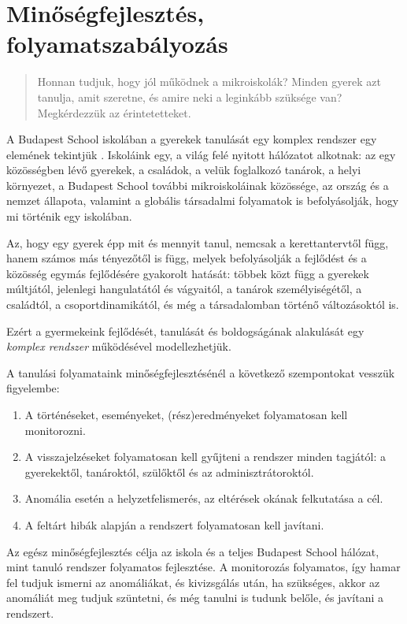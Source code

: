 \section{Minőségfejlesztés, folyamatszabályozás}
\label{sec:minosegbiztositas}
\begin{quote}
  Honnan tudjuk, hogy jól működnek a mikroiskolák? Minden gyerek azt tanulja,
  amit szeretne, és amire neki a leginkább szüksége van? Megkérdezzük az
  érintetetteket.
\end{quote}

A Budapest School iskolában a gyerekek tanulását egy komplex rendszer egy
elemének tekintjük \citep{barabasi}. Iskoláink egy, a világ felé nyitott
hálózatot alkotnak: az egy közösségben lévő gyerekek, a családok, a velük
foglalkozó tanárok, a helyi környezet, a Budapest School további
mikroiskoláinak közössége, az ország és a nemzet állapota, valamint a globális
társadalmi folyamatok is befolyásolják, hogy mi történik egy iskolában.

Az, hogy egy gyerek épp mit és mennyit tanul, nemcsak a kerettantervtől függ,
hanem számos más tényezőtől is függ, melyek befolyásolják a fejlődést és a
közösség egymás fejlődésére gyakorolt hatását: többek közt függ a gyerekek
múltjától, jelenlegi hangulatától és vágyaitól, a tanárok személyiségétől, a
családtól, a csoportdinamikától, és még a társadalomban történő változásoktól
is.

Ezért a gyermekeink fejlődését, tanulását és boldogságának alakulását egy
\emph{komplex rendszer} működésével modellezhetjük.

A tanulási folyamataink minőségfejlesztésénél a következő szempontokat vesszük
figyelembe:
\begin{enumerate}
  \item  A történéseket, eseményeket, (rész)eredményeket folyamatosan kell
        monitorozni.
  \item  A visszajelzéseket folyamatosan kell gyűjteni a rendszer minden
        tagjától: a gyerekektől, tanároktól, szülőktől és az adminisztrátoroktól.
  \item Anomália esetén a helyzetfelismerés, az eltérések okának felkutatása a
        cél.
  \item A feltárt hibák alapján a rendszert folyamatosan kell javítani.
\end{enumerate}

Az egész minőségfejlesztés célja az iskola és a teljes	Budapest School
hálózat, mint tanuló rendszer folyamatos fejlesztése. A monitorozás folyamatos,
így hamar fel tudjuk ismerni az anomáliákat, és kivizsgálás után, ha szükséges,
akkor az anomáliát meg tudjuk szüntetni, és még tanulni is tudunk belőle, és
javítani a rendszert.

